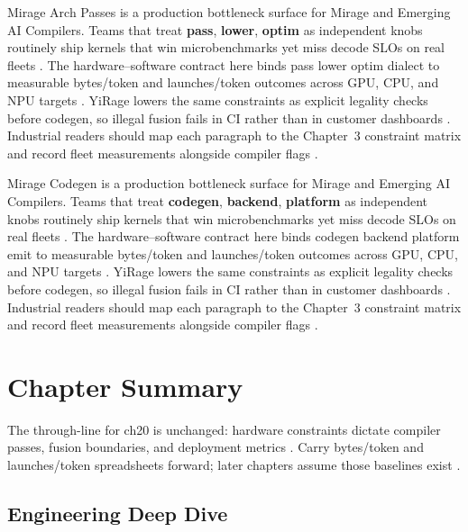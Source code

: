 Mirage Arch Passes is a production bottleneck surface for Mirage and Emerging AI Compilers. Teams that treat \textbf{pass}, \textbf{lower}, \textbf{optim} as independent knobs routinely ship kernels that win microbenchmarks yet miss decode SLOs on real fleets \citep{nvidia2022hopper,amd2024aie}. The hardware--software contract here binds pass lower optim dialect to measurable bytes/token and launches/token outcomes across GPU, CPU, and NPU targets \citep{semianalysis2024tma,dlbook}. YiRage lowers the same constraints as explicit legality checks before codegen, so illegal fusion fails in CI rather than in customer dashboards \citep{amd2024xdna,dao2022flashattention}. Industrial readers should map each paragraph to the Chapter~3 constraint matrix and record fleet measurements alongside compiler flags \citep{amd2024aie,kwon2023vllm}.

Mirage Codegen is a production bottleneck surface for Mirage and Emerging AI Compilers. Teams that treat \textbf{codegen}, \textbf{backend}, \textbf{platform} as independent knobs routinely ship kernels that win microbenchmarks yet miss decode SLOs on real fleets \citep{semianalysis2024tma,dlbook}. The hardware--software contract here binds codegen backend platform emit to measurable bytes/token and launches/token outcomes across GPU, CPU, and NPU targets \citep{amd2024xdna,dao2022flashattention}. YiRage lowers the same constraints as explicit legality checks before codegen, so illegal fusion fails in CI rather than in customer dashboards \citep{amd2024aie,kwon2023vllm}. Industrial readers should map each paragraph to the Chapter~3 constraint matrix and record fleet measurements alongside compiler flags \citep{dlbook,nvidia2024cudagraphs}.

\section{Chapter Summary}
\label{sec:ch20_summary}

The through-line for ch20 is unchanged: hardware constraints dictate compiler passes, fusion boundaries, and deployment metrics \citep{memoryfloor2026,amd2024xdna}. Carry bytes/token and launches/token spreadsheets forward; later chapters assume those baselines exist \citep{semianalysis2024tma,dlbook}.


\subsection{Engineering Deep Dive}
\label{sec:ch20_deep_dive}


